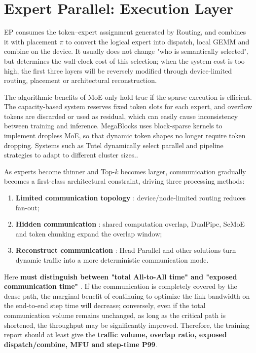 \documentclass[10pt,a4paper,fontset=none]{ctexart}
\newcommand{\term}[1]{\textbf{#1}}
\begin{document}
\section{Expert Parallel: Execution Layer}

EP consumes the token--expert assignment generated by Routing, and combines it with placement $\pi$ to convert the logical expert into dispatch, local GEMM and combine on the device. It usually does not change "who is semantically selected", but determines the wall-clock cost of this selection; when the system cost is too high, the first three layers will be reversely modified through device-limited routing, placement or architectural reconstruction.

The algorithmic benefits of MoE only hold true if the sparse execution is efficient. The capacity-based system reserves fixed token slots for each expert, and overflow tokens are discarded or used as residual, which can easily cause inconsistency between training and inference. MegaBlocks uses block-sparse kernels to implement dropless MoE, so that dynamic token shapes no longer require token dropping\cite{gale2022megablocks}. Systems such as Tutel dynamically select parallel and pipeline strategies to adapt to different cluster sizes.\cite{hwang2022tutel}.

As experts become thinner and Top-$k$ becomes larger, communication gradually becomes a first-class architectural constraint, driving three processing methods:
\begin{enumerate}
\item \term{ Limited communication topology }: device/node-limited routing reduces fan-out;
\item \term{ Hidden communication }: shared computation overlap, DualPipe, ScMoE and token chunking expand the overlap window;
\item \term{ Reconstruct communication }: Head Parallel and other solutions turn dynamic traffic into a more deterministic communication mode.
\end{enumerate}

Here \term{ must distinguish between "total All-to-All time" and "exposed communication time" }. If the communication is completely covered by the dense path, the marginal benefit of continuing to optimize the link bandwidth on the end-to-end step time will decrease; conversely, even if the total communication volume remains unchanged, as long as the critical path is shortened, the throughput may be significantly improved. Therefore, the training report should at least give the \textbf{ traffic volume, overlap ratio, exposed dispatch/combine, MFU and step-time P99}.
\end{document}
